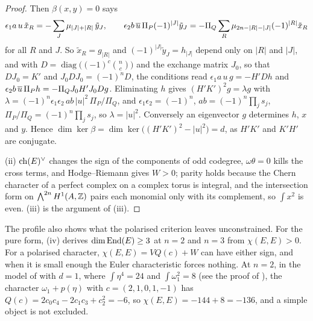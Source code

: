 \begin{proof}
Then $\beta(x,y)=0$ says
\[
  \epsilon_{1}a\,u\,\tilde x_{R}=-\sum_{J}\mu_{|J|+|R|}\,\tilde y_{J},
  \qquad
  \epsilon_{2}b\,\overline{u}\,\Pi_{P}(-1)^{|J|}\tilde y_{J}
  =-\Pi_{Q}\sum_{R}\mu_{2n-|R|-|J|}(-1)^{|R|}\tilde x_{R}
\]
for all $R$ and $J$. So $\tilde x_{R}=g_{|R|}$ and $(-1)^{|J|}\tilde y_{J}=h_{|J|}$
depend only on $|R|$ and $|J|$, and with $D=\operatorname{diag}\bigl((-1)^{c}
\binom{n}{c}\bigr)$ and the exchange matrix $J_{0}$, so that $DJ_{0}=K'$ and
$J_{0}DJ_{0}=(-1)^{n}D$, the conditions read
$\epsilon_{1}a\,u\,g=-H'Dh$ and $\epsilon_{2}b\,\overline{u}\,\Pi_{P}h=-\Pi_{Q}
J_{0}H'J_{0}Dg$. Eliminating $h$ gives $(H'K')^{2}g=\lambda g$ with
$\lambda=(-1)^{n}\epsilon_{1}\epsilon_{2}\,ab\,|u|^{2}\,\Pi_{P}/\Pi_{Q}$, and
$\epsilon_{1}\epsilon_{2}=(-1)^{n}$, $ab=(-1)^{n}\prod_{j}s_{j}$,
$\Pi_{P}/\Pi_{Q}=(-1)^{n}\prod_{j}s_{j}$, so $\lambda=|u|^{2}$. Conversely an
eigenvector $g$ determines $h$, $x$ and $y$. Hence $\dim\ker\beta=
\dim\ker\bigl((H'K')^{2}-|u|^{2}\bigr)=d$, as $H'K'$ and $K'H'$ are
conjugate.

(ii) $\operatorname{ch}(E)^{\vee}$ changes the sign of
the components of odd codegree, $\omega\theta=0$ kills the cross terms, and
Hodge--Riemann gives $W>0$; parity holds because the Chern character of a
perfect complex on a complex torus is integral, and the intersection form on
$\bigwedge^{2n}H^{1}(A,\mathbb{Z})$ pairs each monomial only with its complement, so
$\int x^{2}$ is even. (iii) is the argument of (iii).
\end{proof}

The profile also shows what the polarised criterion leaves unconstrained. For
the pure form, (iv) derives $\dim\operatorname{End}(E)\ge3$ at $n=2$ and
$n=3$ from $\chi(E,E)>0$. For a polarised character, $\chi(E,E)=VQ(c)+W$ can
have either sign, and when it is small enough the Euler characteristic forces
nothing. At $n=2$, in the model of \cite[Setup~4.1]{paperI} with $d=1$, where
$\int\eta^{4}=24$ and $\int\omega_{1}^{2}=8$ (see the proof of
), the character $\omega_{1}+p(\eta)$ with
$c=(2,1,0,1,-1)$ has $Q(c)=2c_{0}c_{4}-2c_{1}c_{3}+c_{2}^{2}=-6$, so
$\chi(E,E)=-144+8=-136$, and a simple object is not excluded.

